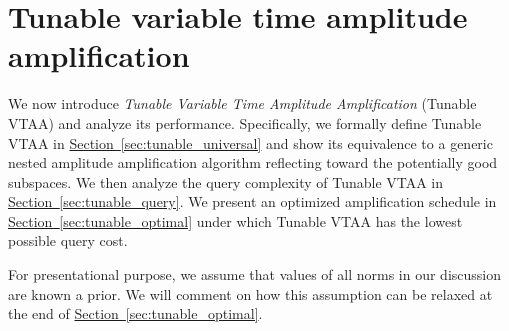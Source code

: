 \documentclass[letterpaper,onecolumn,11pt,accepted=2026-02-14]{quantumarticle}
\theoremstyle{remark}
\theoremstyle{plain}
\renewcommand{\sec}[1]{\hyperref[sec:#1]{Section~\ref*{sec:#1}}}
\begin{document}
\section{Tunable variable time amplitude amplification}
\label{sec:tunable}

We now introduce \emph{Tunable Variable Time Amplitude Amplification} (Tunable VTAA) and analyze its performance. Specifically, we formally define Tunable VTAA in \sec{tunable_universal} and show its equivalence to a generic nested amplitude amplification algorithm reflecting toward the potentially good subspaces. We then analyze the query complexity of Tunable VTAA in \sec{tunable_query}. We present an optimized amplification schedule in \sec{tunable_optimal} under which Tunable VTAA has the lowest possible query cost.

For presentational purpose, we assume that values of all norms in our discussion are known a prior. We will comment on how this assumption can be relaxed at the end of \sec{tunable_optimal}.

\end{document}

